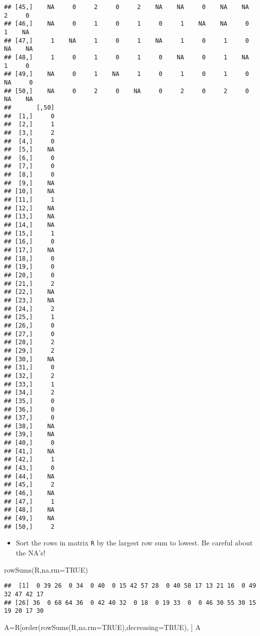 \documentclass[
]{article}
\newenvironment{Shaded}{\begin{snugshade}}{\end{snugshade}}
\newcommand{\AttributeTok}[1]{\textcolor[rgb]{0.77,0.63,0.00}{#1}}
\newcommand{\ConstantTok}[1]{\textcolor[rgb]{0.00,0.00,0.00}{#1}}
\newcommand{\FunctionTok}[1]{\textcolor[rgb]{0.00,0.00,0.00}{#1}}
\newcommand{\NormalTok}[1]{#1}
\newcommand{\OtherTok}[1]{\textcolor[rgb]{0.56,0.35,0.01}{#1}}
\providecommand{\tightlist}{%
  \setlength{\itemsep}{0pt}\setlength{\parskip}{0pt}}
\begin{document}
\begin{verbatim}
## [45,]    NA     0     2     0     2    NA    NA     0    NA    NA     2     0
## [46,]    NA     0     1     0     1     0     1    NA    NA     0     1    NA
## [47,]     1    NA     1     0     1    NA     1     0     1     0    NA    NA
## [48,]     1     0     1     0     1     0    NA     0     1    NA     1     0
## [49,]    NA     0     1    NA     1     0     1     0     1     0    NA     0
## [50,]    NA     0     2     0    NA     0     2     0     2     0    NA    NA
##       [,50]
##  [1,]     0
##  [2,]     1
##  [3,]     2
##  [4,]     0
##  [5,]    NA
##  [6,]     0
##  [7,]     0
##  [8,]     0
##  [9,]    NA
## [10,]    NA
## [11,]     1
## [12,]    NA
## [13,]    NA
## [14,]    NA
## [15,]     1
## [16,]     0
## [17,]    NA
## [18,]     0
## [19,]     0
## [20,]     0
## [21,]     2
## [22,]    NA
## [23,]    NA
## [24,]     2
## [25,]     1
## [26,]     0
## [27,]     0
## [28,]     2
## [29,]     2
## [30,]    NA
## [31,]     0
## [32,]     2
## [33,]     1
## [34,]     2
## [35,]     0
## [36,]     0
## [37,]     0
## [38,]    NA
## [39,]    NA
## [40,]     0
## [41,]    NA
## [42,]     1
## [43,]     0
## [44,]    NA
## [45,]     2
## [46,]    NA
## [47,]     1
## [48,]    NA
## [49,]    NA
## [50,]     2
\end{verbatim}

\begin{itemize}
\tightlist
\item
  Sort the rows in matrix \texttt{R} by the largest row sum to lowest.
  Be careful about the NA's!
\end{itemize}

\begin{Shaded}
\begin{Highlighting}[]
\FunctionTok{rowSums}\NormalTok{(R,}\AttributeTok{na.rm=}\ConstantTok{TRUE}\NormalTok{)}
\end{Highlighting}
\end{Shaded}

\begin{verbatim}
##  [1]  0 39 26  0 34  0 40  0 15 42 57 28  0 40 58 17 13 21 16  0 49 32 47 42 17
## [26] 36  0 68 64 36  0 42 40 32  0 18  0 19 33  0  0 46 30 55 30 15 19 20 17 30
\end{verbatim}

\begin{Shaded}
\begin{Highlighting}[]
\NormalTok{A}\OtherTok{=}\NormalTok{R[}\FunctionTok{order}\NormalTok{(}\FunctionTok{rowSums}\NormalTok{(R,}\AttributeTok{na.rm=}\ConstantTok{TRUE}\NormalTok{),}\AttributeTok{decreasing=}\ConstantTok{TRUE}\NormalTok{), ]}
\NormalTok{A}
\end{Highlighting}
\end{Shaded}
\end{document}
